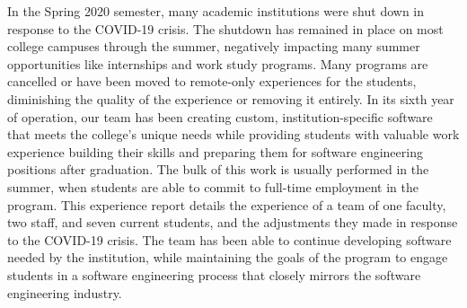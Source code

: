 In the Spring 2020 semester, many academic institutions were shut down in response to the COVID-19 crisis.
The shutdown has remained in place on most college campuses through the summer, negatively impacting many summer opportunities like internships and work study programs. Many programs are cancelled or have been moved to remote-only experiences for the students, diminishing the quality of the experience or removing it entirely. In its sixth year of operation, our team has been creating custom, institution-specific software that meets the college's unique needs while providing students with valuable work experience building their skills and preparing them for software engineering positions after graduation. The bulk of this work is usually performed in the summer, when students are able to commit to full-time employment in the program. This experience report details the experience of a team of one faculty, two staff, and seven current students, and the adjustments they made in response to the COVID-19 crisis. The team has been able to continue developing software needed by the institution, while maintaining the goals of the program to engage students in a software engineering process that closely mirrors the software engineering industry.




